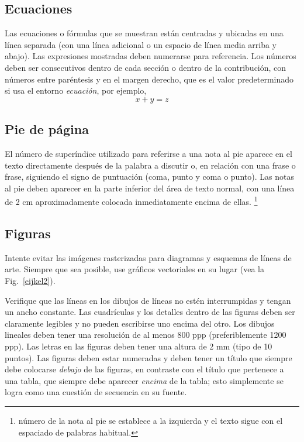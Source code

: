 \documentclass[runningheads,a4paper]{llncs}
\begin{document}
\subsection{Ecuaciones}
Las ecuaciones o fórmulas que se muestran están centradas y ubicadas en una línea separada (con una línea adicional o un espacio de línea media arriba y abajo). Las expresiones mostradas deben numerarse para referencia. Los números deben ser consecutivos dentro de cada sección o dentro de la contribución, con números entre paréntesis y en el margen derecho, que es el valor predeterminado si usa el entorno \emph{ecuación}, por ejemplo,
\begin{equation}
x + y = z
\end{equation}

\subsection{Pie de p\'{a}gina}

El número de superíndice utilizado para referirse a una nota al pie aparece en el texto directamente después de la palabra a discutir o, en relación con una frase o frase, siguiendo el signo de puntuación (coma, punto y coma o punto). Las notas al pie deben aparecer en la parte inferior del área de texto normal, con una línea de 2 cm aproximadamente colocada inmediatamente encima de ellas. \footnote{número de la nota al pie se establece a la izquierda y el texto sigue con el espaciado de palabras habitual.}

\subsection{Figuras}
Intente evitar las imágenes rasterizadas para diagramas y esquemas de líneas de arte. Siempre que sea posible, use gráficos vectoriales en su lugar (vea la Fig.~\ref{eijkel2}).

Verifique que las líneas en los dibujos de líneas no estén interrumpidas y tengan un ancho constante. Las cuadrículas y los detalles dentro de las figuras deben ser claramente legibles y no pueden escribirse uno encima del otro. Los dibujos lineales deben tener una resolución de al menos 800 ppp (preferiblemente 1200 ppp). Las letras en las figuras deben tener una altura de 2 mm (tipo de 10 puntos). Las figuras deben estar numeradas y deben tener un título que siempre debe colocarse \emph{debajo} de las figuras, en contraste con el título que pertenece a una tabla, que siempre debe aparecer \emph{encima} de la tabla; esto simplemente se logra como una cuestión de secuencia en su fuente.
\end{document}
